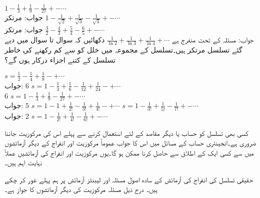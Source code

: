 \quad
$1-\tfrac{1}{3}+\tfrac{1}{9}-\tfrac{1}{27}+-\cdots$\\
جواب:\quad
مرتکز
\quad
$1-\tfrac{1}{\sqrt{2}}+\tfrac{1}{\sqrt{3}}-\tfrac{1}{\sqrt{4}}+-\cdots$\\
جواب:\quad
مرتکز
\quad
$\tfrac{3}{2}-\tfrac{4}{3}+\tfrac{5}{4}-\tfrac{6}{5}+-\cdots$\\
جواب:\quad
مسئلہ  کے تحت منفرج  ہے
\quad
$\tfrac{1}{\ln 2}+\tfrac{1}{\ln 3}+\tfrac{1}{\ln 4}+\cdots$
دکھائیں کہ سوال  تا سوال  میں دیے گئے تسلسل مرتکز ہیں۔تسلسل کے مجموعہ  میں خلل  کو  سے کم رکھنے کی خاطر تسلسل کے کتنے اجزاء درکار ہوں گے؟

\quad
$s=\tfrac{1}{2}-\tfrac{1}{4}+\tfrac{1}{8}-+\cdots$\\
جواب:\quad 
$6$
\quad
$s=1-\tfrac{1}{3}+\tfrac{1}{6}-\tfrac{1}{12}+\tfrac{1}{24}-+\cdots$\\
$6$
\quad
$s=1-\tfrac{1}{3}+\tfrac{1}{9}-\tfrac{1}{27}+-\cdots$\\
جواب:\quad
$5$
\quad
$s=1-1+\tfrac{1}{2!}-\tfrac{1}{3!}+\tfrac{1}{4!}-+\cdots$
\quad
$s=1-\tfrac{1}{3!}+\tfrac{1}{5!}-\tfrac{1}{7!}+-\cdots$\\
جواب:\quad
$2$
\quad
$s=1-\tfrac{1}{2!}+\tfrac{1}{4!}-\tfrac{1}{6!}+-\cdots$

کسی بھی تسلسل کو حساب یا دیگر مقاصد کے لئے استعمال کرنے سے پہلے اس کی مرکوزیت جاننا ضروری ہے۔انجینئری حساب کے مسائل میں اس کا جواب عموماً مرکوزیت اور انفراج کے دیگر آزمائشوں میں سے کسی ایک کے اطلاق سے حاصل کرنا ممکن ہو گا۔یوں مرکوزیت اور انفراج کی آزمائشیں عملاً نہایت اہم ہیں۔

حقیقی تسلسل کی انفراج کی آزمائش کے سادہ اصول مسئلہ  اور لیبنٹز آزمائش پر ہم پہلے غور کر چکے ہیں۔ درج ذیل مسئلہ مرکوزیت کی دیگر آزمائشوں کا جواز ہے۔

